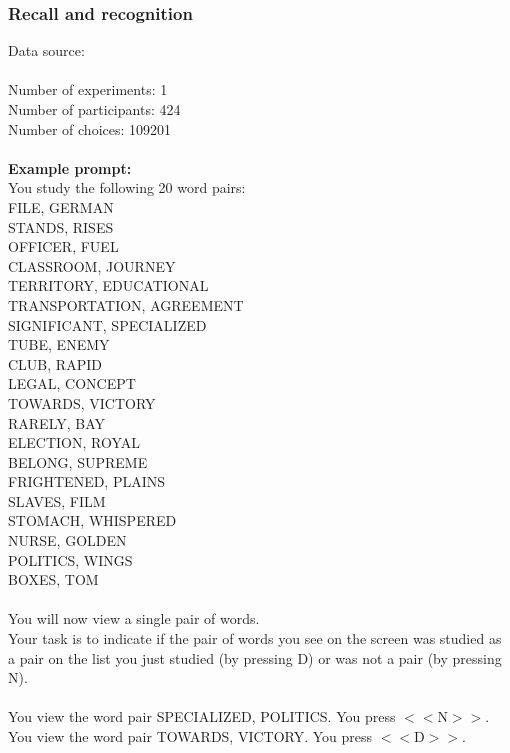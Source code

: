 \documentclass[pdflatex,sn-nature]{sn-jnl}%
\theoremstyle{thmstyleone}%
\theoremstyle{thmstyletwo}%
\theoremstyle{thmstylethree}%
\begin{document}
\subsubsection*{Recall and recognition}
Data source: \cite{cox2018information} \\ $~$ \\
Number of experiments: 1 $~$\\ 
Number of participants: 424 $~$\\ 
Number of choices: 109201 $~$\\ 
 $~$\\ 
\textbf{Example prompt:}
 $~$\\ 
You study the following 20 word pairs: $~$\\ 
FILE, GERMAN $~$\\ 
STANDS, RISES $~$\\ 
OFFICER, FUEL $~$\\ 
CLASSROOM, JOURNEY $~$\\ 
TERRITORY, EDUCATIONAL $~$\\ 
TRANSPORTATION, AGREEMENT $~$\\ 
SIGNIFICANT, SPECIALIZED $~$\\ 
TUBE, ENEMY $~$\\ 
CLUB, RAPID $~$\\ 
LEGAL, CONCEPT $~$\\ 
TOWARDS, VICTORY $~$\\ 
RARELY, BAY $~$\\ 
ELECTION, ROYAL $~$\\ 
BELONG, SUPREME $~$\\ 
FRIGHTENED, PLAINS $~$\\ 
SLAVES, FILM $~$\\ 
STOMACH, WHISPERED $~$\\ 
NURSE, GOLDEN $~$\\ 
POLITICS, WINGS $~$\\ 
BOXES, TOM $~$\\ 
 $~$\\ 
You will now view a single pair of words. $~$\\ 
Your task is to indicate if the pair of words you see on the screen was studied as a pair on the list you just studied (by pressing D) or was not a pair (by pressing N). $~$\\ 
 $~$\\ 
You view the word pair SPECIALIZED, POLITICS. You press $<<$N$>>$. $~$\\ 
You view the word pair TOWARDS, VICTORY. You press $<<$D$>>$. $~$\\ 
\end{document}
